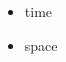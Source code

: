 \begin{frame}
\begin{itemize}
\begin{itemize}
\item time

\item space

\end{itemize}

\end{itemize}

\end{frame}
